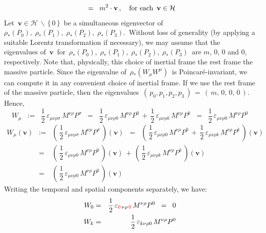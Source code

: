 \begin{enumerate}
\begin{equation*}
	\;\; = \;\;
		m^{2} \cdot \mathbf{v}\,,
	\quad
	\textnormal{for each \,$\mathbf{v} \in \mathcal{H}$}
	\end{equation*}
	\vskip 0.1cm
	Let \,$\mathbf{v} \in \mathcal{H}\,\backslash\,\{\,0\,\}$\, be a simultaneous eigenvector of
	\,$\rho_{*}(P_{0}),\; \rho_{*}(P_{1}),\; \rho_{*}(P_{2}),\; \rho_{*}(P_{3})$.\,
	Without loss of generality (by applying a suitable Lorentz transformation if necessary),
	we may assume that the eigenvalues of \,$\mathbf{v}$\, for
	\,$\rho_{*}(P_{0}),\; \rho_{*}(P_{1}),\; \rho_{*}(P_{2}),\; \rho_{*}(P_{3})$\,
	are $m$, $0$, $0$ and $0$, respectively.
	Note that, physically, this choice of inertial frame the rest frame the massive particle.
	\vskip 0.1cm
	Since the eigenvalue of \,$\rho_{*}(W_{\mu}W^{\mu})$\, is Poincaré-invariant,
	we can compute it in any convenient choice of inertial frame.
	If we use the rest frame of the massive particle, then the eigenvalues
	\,$(\,p_{0},p_{1},p_{2},p_{3}\,) \,=\, (\,m,\,0,\,0,\,0\,)$.\,
	Hence,
	\begin{equation*}
	W_{\mu}
	\;\; := \;\;
		\dfrac{1}{2}\,\varepsilon_{\mu\nu\rho\sigma}\,M^{\nu\rho}P^{\sigma}
	\;\; = \;\;
		\dfrac{1}{2}\,\varepsilon_{\mu\nu\rho 0}\,M^{\nu\rho}P^{0}
		\,+\,
		\dfrac{1}{2}\,\varepsilon_{\mu\nu\rho k}\,M^{\nu\rho}P^{k}
	\;\; = \;\;
		\dfrac{1}{2}\,\varepsilon_{\mu\nu\rho 0}\,M^{\nu\rho}P^{0}
	\end{equation*}
	\begin{eqnarray*}
	W_{\mu}(\mathbf{v})
	& := &
		\left(\,
			\dfrac{1}{2}\,\varepsilon_{\mu\nu\rho\sigma}\,M^{\nu\rho}P^{\sigma}
			\,\right)\!(\mathbf{v})
	\;\; = \;\;
		\left(\,
			\dfrac{1}{2}\,\varepsilon_{\mu\nu\rho 0}\,M^{\nu\rho}P^{0}
			\,+\,
			\dfrac{1}{2}\,\varepsilon_{\mu\nu\rho k}\,M^{\nu\rho}P^{k}
			\,\right)\!(\mathbf{v})
	\\
	& = &
		\left(\,
			\dfrac{1}{2}\,\varepsilon_{\mu\nu\rho 0}\,M^{\nu\rho}P^{0}
			\,\right)\!(\mathbf{v})
			\,+\,
		\left(\,
			\dfrac{1}{2}\,\varepsilon_{\mu\nu\rho k}\,M^{\nu\rho}P^{k}
			\,\right)\!(\mathbf{v})
	\\
	& = &
		\left(\,
			\dfrac{1}{2}\,\varepsilon_{\mu\nu\rho 0}\,M^{\nu\rho}P^{0}
			\,\right)\!(\mathbf{v})
	\end{eqnarray*}
	Writing the temporal and spatial components separately, we have:
	\begin{eqnarray*}
	W_{0}
	& = &
		\dfrac{1}{2}\,\varepsilon_{{\color{red}0\,}\nu\rho{\color{red}\,0}}\,M^{\nu\rho}P^{0}
	\;\; = \;\;
		0
	\\
	W_{k}
	& = &
		\dfrac{1}{2}\,\varepsilon_{k\nu\rho 0}\,M^{\nu\rho}P^{0}

\end{eqnarray*}
\end{enumerate}
